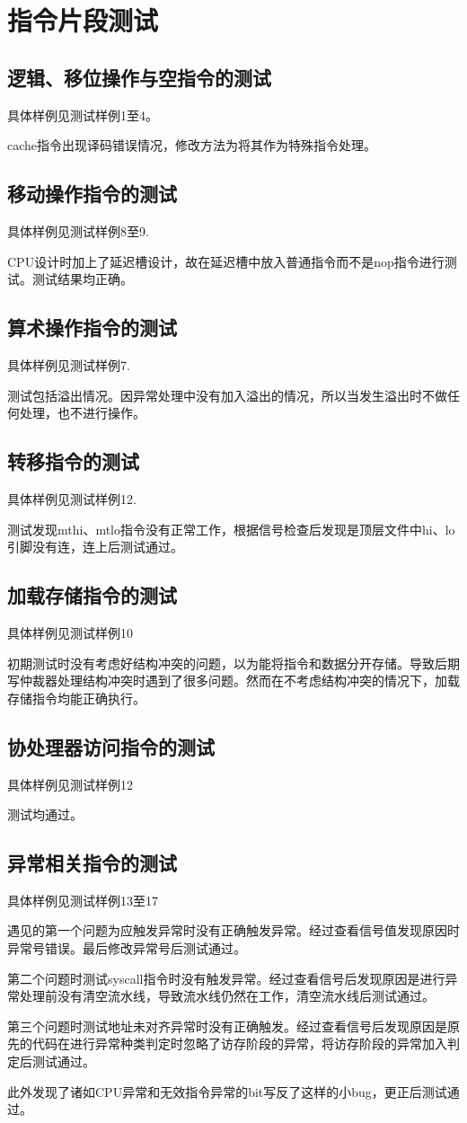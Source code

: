 \section{指令片段测试}
\subsection{逻辑、移位操作与空指令的测试}
具体样例见测试样例1至4。

cache指令出现译码错误情况，修改方法为将其作为特殊指令处理。

\subsection{移动操作指令的测试}
具体样例见测试样例8至9.

CPU设计时加上了延迟槽设计，故在延迟槽中放入普通指令而不是nop指令进行测试。测试结果均正确。

\subsection{算术操作指令的测试}
具体样例见测试样例7.

测试包括溢出情况。因异常处理中没有加入溢出的情况，所以当发生溢出时不做任何处理，也不进行操作。

\subsection{转移指令的测试}
具体样例见测试样例12.

测试发现mthi、mtlo指令没有正常工作，根据信号检查后发现是顶层文件中hi、lo引脚没有连，连上后测试通过。

\subsection{加载存储指令的测试}
具体样例见测试样例10

初期测试时没有考虑好结构冲突的问题，以为能将指令和数据分开存储。导致后期写仲裁器处理结构冲突时遇到了很多问题。然而在不考虑结构冲突的情况下，加载存储指令均能正确执行。

\subsection{协处理器访问指令的测试}
具体样例见测试样例12

测试均通过。

\subsection{异常相关指令的测试}
具体样例见测试样例13至17

遇见的第一个问题为应触发异常时没有正确触发异常。经过查看信号值发现原因时异常号错误。最后修改异常号后测试通过。

第二个问题时测试syscall指令时没有触发异常。经过查看信号后发现原因是进行异常处理前没有清空流水线，导致流水线仍然在工作，清空流水线后测试通过。

第三个问题时测试地址未对齐异常时没有正确触发。经过查看信号后发现原因是原先的代码在进行异常种类判定时忽略了访存阶段的异常，将访存阶段的异常加入判定后测试通过。

此外发现了诸如CPU异常和无效指令异常的bit写反了这样的小bug，更正后测试通过。
